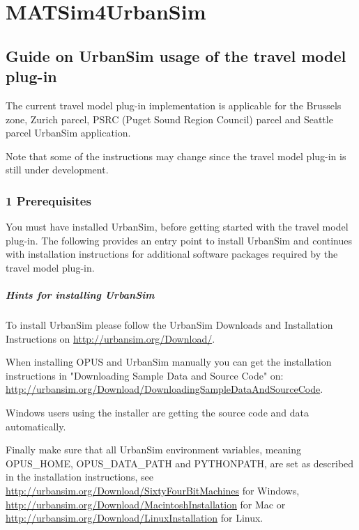 \section{MATSim4UrbanSim}

\subsection{Guide on UrbanSim usage of the travel model plug-in}

The current travel model plug-in implementation is applicable for the  Brussels zone, Zurich parcel, PSRC (Puget Sound Region Council) parcel  and Seattle parcel UrbanSim application.

Note that some of the instructions may change since the travel model plug-in is still under development.

\subsubsection{1 Prerequisites}

You must have installed UrbanSim, before getting started with the  travel model plug-in. The following provides an entry point to install  UrbanSim and continues with installation instructions for additional  software packages required by the travel model plug-in.

\subparagraph{Hints for installing UrbanSim}

To install UrbanSim please follow the UrbanSim Downloads and Installation Instructions on \href{http://urbansim.org/Download/}{http://urbansim.org/Download/}.

When installing OPUS and UrbanSim manually you can get the  installation instructions in "Downloading Sample Data and Source Code"  on: \href{http://urbansim.org/Download/DownloadingSampleDataAndSourceCode}{http://urbansim.org/Download/DownloadingSampleDataAndSourceCode}.

Windows users using the installer are getting the source code and data automatically.

Finally make sure that all UrbanSim environment variables, meaning  OPUS\_HOME, OPUS\_DATA\_PATH and PYTHONPATH, are set as described in the  installation instructions, see \href{http://urbansim.org/Download/SixtyFourBitMachines}{http://urbansim.org/Download/SixtyFourBitMachines} for Windows, \href{http://urbansim.org/Download/MacintoshInstallation}{http://urbansim.org/Download/MacintoshInstallation} for Mac or \href{http://urbansim.org/Download/LinuxInstallation}{http://urbansim.org/Download/LinuxInstallation} for Linux.

